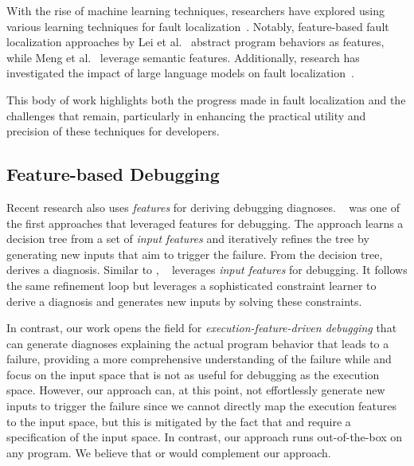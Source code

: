 With the rise of machine learning techniques, researchers have explored using various learning techniques for fault localization~\cite{li2019deepfl,li2021covrepresentation,widyasari2022xai4fl,wang2024mtltransfer,yang2024multilingual,li2022cc}.
Notably, feature-based fault localization approaches by Lei et al.~\cite{lei2022featurefl} abstract program behaviors as features, while Meng et al.~\cite{meng2022transfer} leverage semantic features.
Additionally, research has investigated the impact of large language models on fault localization~\cite{kang2024llm}.

This body of work highlights both the progress made in fault localization and the challenges that remain, particularly in enhancing the practical utility and precision of these techniques for developers.


\subsection{Feature-based Debugging}%
\label{sub:related-execution-features}

Recent research also uses \emph{features} for deriving debugging diagnoses.
\ALHAZEN{}~\cite{kampmann2020alhazen} was one of the first approaches that leveraged features for debugging.
The approach learns a decision tree from a set of \emph{input features} and iteratively refines the tree by generating new inputs that aim to trigger the failure.
From the decision tree, \ALHAZEN{} derives a diagnosis.
Similar to \ALHAZEN{}, \AVICENNA{}~\cite{eberlein2023avicenna} leverages \emph{input features} for debugging.
It follows the same refinement loop but leverages a sophisticated constraint learner to derive a diagnosis and generates new inputs by solving these constraints.

In contrast, our work opens the field for \emph{execution-feature-driven debugging} that can generate diagnoses explaining the actual program behavior that leads to a failure, providing a more comprehensive understanding of the failure while \ALHAZEN{} and \AVICENNA{} focus on the input space that is not as useful for debugging as the execution space.
However, our approach can, at this point, not effortlessly generate new inputs to trigger the failure since we cannot directly map the execution features to the input space, but this is mitigated by the fact that \ALHAZEN{} and \AVICENNA{} require a specification of the input space. In contrast, our approach runs out-of-the-box on any program.
We believe that \ALHAZEN{} or \AVICENNA{} would complement our approach.
